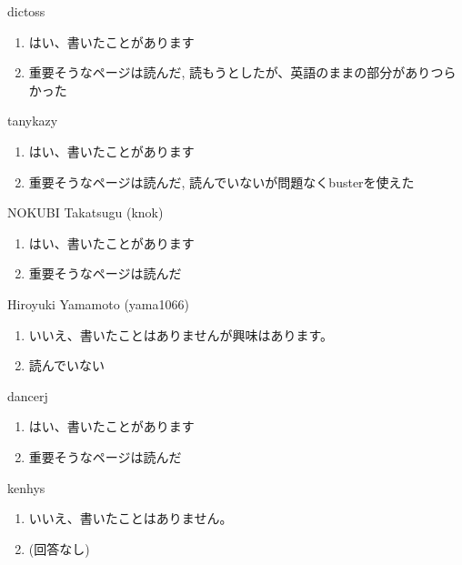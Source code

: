 \begin{prework}{ dictoss }
  \begin{enumerate}
  \item はい、書いたことがあります
  \item 重要そうなページは読んだ, 読もうとしたが、英語のままの部分がありつらかった
  \end{enumerate}
\end{prework}

\begin{prework}{ tanykazy }
  \begin{enumerate}
  \item はい、書いたことがあります
  \item 重要そうなページは読んだ, 読んでいないが問題なくbusterを使えた
  \end{enumerate}
\end{prework}

\begin{prework}{ NOKUBI Takatsugu (knok) }
  \begin{enumerate}
  \item はい、書いたことがあります
  \item 重要そうなページは読んだ
  \end{enumerate}
\end{prework}

\begin{prework}{ Hiroyuki Yamamoto (yama1066) }
  \begin{enumerate}
  \item いいえ、書いたことはありませんが興味はあります。
  \item 読んでいない
  \end{enumerate}
\end{prework}

\begin{prework}{ dancerj }
  \begin{enumerate}
  \item はい、書いたことがあります
  \item 重要そうなページは読んだ
  \end{enumerate}
\end{prework}

\begin{prework}{ kenhys }
  \begin{enumerate}
  \item いいえ、書いたことはありません。
  \item (回答なし)
  \end{enumerate}
\end{prework}

